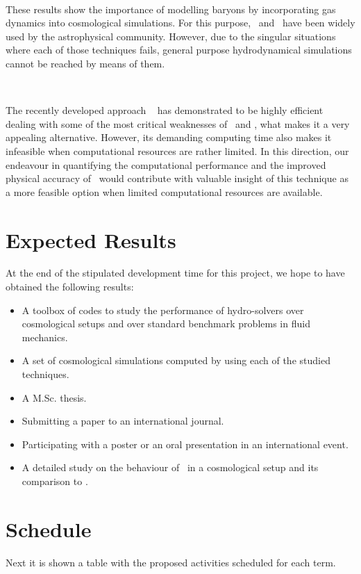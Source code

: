 \documentclass[a4,useAMS,usenatbib,usegraphicx,12pt]{article}
\begin{document}
\

These results show the importance of modelling baryons by incorporating gas 
dynamics into cosmological simulations. For this purpose, \AMR\ and \SPH\ have
been widely used by the astrophysical community. However, due to the singular 
situations where each of those techniques fails, general purpose hydrodynamical
simulations cannot be reached by means of them.

\

The recently developed approach \AREPO\ \citet{Springel10} has demonstrated to 
be highly efficient dealing with some of the most critical weaknesses of \AMR\ 
and \SPH, what makes it a very appealing alternative. However, its demanding 
computing time also makes it infeasible when computational resources are rather 
limited. In this direction, our endeavour in quantifying the computational 
performance and the improved physical accuracy of \VPH\ would contribute with 
valuable insight of this technique as a more feasible option when limited 
computational resources are available.


\section{Expected Results}
At the end of the stipulated development time for this project, we hope to have
obtained the following results:
\begin{itemize}
\item A toolbox of codes to study the performance of hydro-solvers over 
cosmological setups and over standard benchmark problems in fluid mechanics.
\item A set of cosmological simulations computed by using each of the studied
techniques.
\item A M.Sc. thesis.
\item Submitting a paper to an international journal.
\item Participating with a poster or an oral presentation in an international
event.
\item A detailed study on the behaviour of \VPH\ in a cosmological setup and 
its comparison to \SPH.
\end{itemize}


\section{Schedule}
Next it is shown a table with the proposed activities scheduled for each term.
\end{document}
